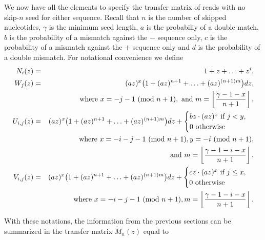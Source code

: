 \documentclass{article}
\newcommand{\modulo}[1]{\ (\mathrm{mod}\ #1)}
\begin{document}
We now have all the elements to specify the transfer matrix of reads with
no skip-$n$ seed for either sequence. Recall that $n$ is the number of
skipped nucleotides, $\gamma$ is the minimum seed length, $a$ is the
probabiliy of a double match, $b$ is the probability of a mismatch against
the $-$ sequence only, $c$ is the probability of a mismatch against the
$+$ sequence only and $d$ is the probability of a double mismatch. For
notational convenience we define
\begin{eqnarray}
\label{eq_N}
N_i(z) &=& 1+z+\ldots+z^i, \\
W_j(z) &=& (az)^x \big( 1 + (az)^{n+1} + \ldots +
  (az)^{(n+1)m} \big) dz, \\
  \notag
  &\quad& \text{where } x = -j-1 \modulo{n+1},
  \text{ and } m = \left\lfloor
  \frac{\gamma-1-x}{n+1} \right\rfloor, \\
U_{i,j}(z) &=& (az)^x
  \big( 1 + (az)^{n+1} + \ldots + (az)^{(n+1)m} \big)dz +
\begin{cases}
  bz\cdot(az)^x \text{ if } j < y, \\
  0 \text{ otherwise}
\end{cases} \\
  \notag
  &\quad& \text{where } x = -i-j-1 \modulo{n+1},
  y = -i \modulo{n+1}, \\
  \notag
  &\quad& \text{and } m = \left\lfloor \frac{\gamma-1-i-x}{n+1}
    \right\rfloor, \\
V_{i,j}(z) &=& (az)^x 
  \big( 1 + (az)^{n+1} + \ldots + (az)^{(n+1)m} \big)dz +
\begin{cases}
  cz\cdot(az)^x \text{ if } j \leq x, \\
  0 \text{ otherwise}
\end{cases} \\
  \notag
  &\quad& \text{ where } x = -i-j-1 \modulo{n+1},
  m = \left\lfloor \frac{\gamma-1-i-x}{n+1} \right\rfloor.
\end{eqnarray}

With these notations, the information from the previous sections can be
summarized in the transfer matrix $\tilde{M}_n(z)$ equal to

\pagebreak
\end{document}
